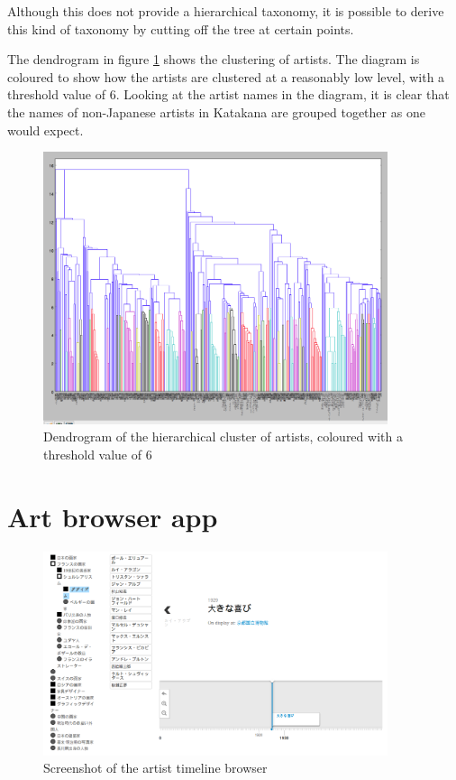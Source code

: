 \documentclass[11pt]{article}
\begin{document}
Although this does not provide a hierarchical taxonomy, it is possible to derive this kind of taxonomy by cutting off the tree at certain points.

The dendrogram in figure \ref{fig:dendro} shows the clustering of artists. The diagram is coloured to show how the artists are clustered at a reasonably low level, with a threshold value of 6. Looking at the artist names in the diagram, it is clear that the names of non-Japanese artists in Katakana are grouped together as one would expect.

\begin{figure}
        \centering
                \includegraphics[width=0.9\textwidth]{dendro.png}
        \caption{Dendrogram of the hierarchical cluster of artists, coloured with a threshold value of 6}\label{fig:dendro}
\end{figure}

\section{Art browser app}
\begin{figure}
        \centering
                \includegraphics[width=0.9\textwidth]{timeline.png}
        \caption{Screenshot of the artist timeline browser}\label{fig:timeline}
\end{figure}
\end{document}
